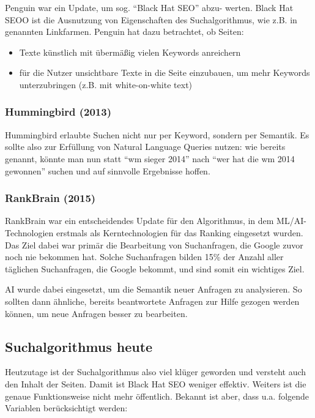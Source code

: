 \documentclass{article}
\begin{document}
Penguin war ein Update, um sog. ``Black Hat SEO'' abzu- werten\cite{ah}. Black Hat SEOO ist die Ausnutzung von Eigenschaften des Suchalgorithmus, wie z.B. in genannten Linkfarmen. Penguin hat dazu betrachtet, ob Seiten:

\begin{itemize}
    \item Texte künstlich mit übermäßig vielen Keywords anreichern
    \item für die Nutzer unsichtbare Texte in die Seite einzubauen, um mehr Keywords unterzubringen (z.B. mit white-on-white text)
\end{itemize}

\subsubsection{Hummingbird (2013)}

Hummingbird erlaubte Suchen nicht nur per Keyword, sondern per Semantik\cite{ah}. Es sollte also zur Erfüllung von Natural Language Queries nutzen: wie bereits genannt, könnte man nun statt ``wm sieger 2014'' nach ``wer hat die wm 2014 gewonnen'' suchen und auf sinnvolle Ergebnisse hoffen.

\subsubsection{RankBrain (2015)}

RankBrain war ein entscheidendes Update für den Algorithmus, in dem ML/AI-Technologien erstmals als Kerntechnologien für das Ranking eingesetzt wurden\cite{ah}\cite{ahr}. Das Ziel dabei war primär die Bearbeitung von Suchanfragen, die Google zuvor noch nie bekommen hat. Solche Suchanfragen bilden 15\% der Anzahl aller täglichen Suchanfragen, die Google bekommt\cite{nqs}, und sind somit ein wichtiges Ziel.

AI wurde dabei eingesetzt, um die Semantik neuer Anfragen zu analysieren. So sollten dann ähnliche, bereits beantwortete Anfragen zur Hilfe gezogen werden können, um neue Anfragen besser zu bearbeiten\cite{ahr}.

\subsection{Suchalgorithmus heute}

Heutzutage ist der Suchalgorithmus also viel klüger geworden und versteht auch den Inhalt der Seiten. Damit ist Black Hat SEO weniger effektiv. Weiters ist die genaue Funktionsweise nicht mehr öffentlich. Bekannt ist aber, dass u.a. folgende Variablen berücksichtigt werden:
\end{document}
